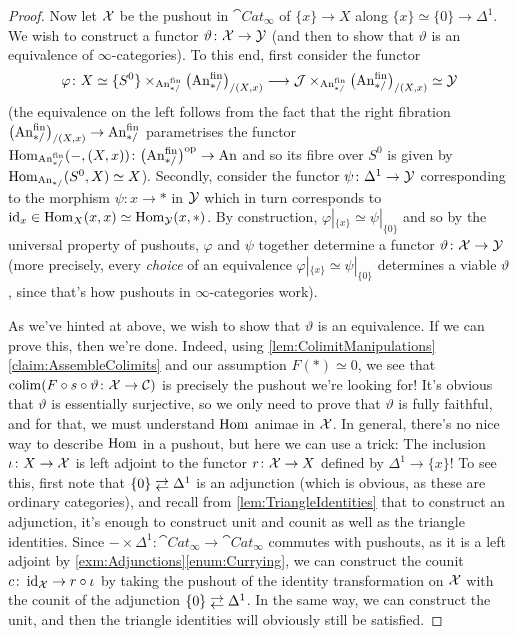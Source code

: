 \begin{proof}
	Now let $\mathcal{X}$ be the pushout in $\cat{Cat}_\infty$ of $\{x\}\rightarrow X$ along $\{x\}\simeq \{0\}\rightarrow \Delta^1$. We wish to construct a functor $\vartheta\colon \mathcal{X}\rightarrow \mathcal{Y}$ (and then to show that $\vartheta$ is an equivalence of $\infty$-categories). To this end, first consider the functor
	\begin{equation*}
		\varphi\colon X\simeq \{S^0\}\times_{\FinAn}\bigl(\FinAn\bigr)_{/(X,x)}\longrightarrow \Jj\times_{\FinAn}\bigl(\FinAn\bigr)_{/(X,x)}\simeq \Yy
	\end{equation*}
	(the equivalence on the left follows from the fact that the right fibration $\bigl(\FinAn\bigr)\vphantom{)}^\mathrm{\phantom{fin}}_{/(X,x)}\rightarrow \FinAn$ parametrises the functor $\Hom_{\FinAn}(-,(X,x))\colon \bigl(\FinAn\bigr)^{\smash{\op}}\rightarrow \cat{An}$ and so its fibre over $S^0$ is given by $\operatorname{Hom}_{\mathrm{An}_{*/}}(S^0,X)\simeq X$). Secondly, consider the functor $\psi\colon \Delta^1\rightarrow \mathcal{Y}$ corresponding to the morphism $\psi\colon x\rightarrow *$ in $\mathcal{Y}$ which in turn corresponds to $\operatorname{id}_x\in \operatorname{Hom}_X(x,x)\simeq \operatorname{Hom}_{\mathcal{Y}}(x,*)$. By construction, $\varphi|_{\{x\}}\simeq \psi|_{\{0\}}$ and so by the universal property of pushouts, $\varphi$ and $\psi$ together determine a functor $\vartheta\colon \mathcal{X}\rightarrow \mathcal{Y}$ (more precisely, every \emph{choice} of an equivalence $\varphi|_{\{x\}}\simeq \psi|_{\{0\}}$ determines a viable $\vartheta$, since that's how pushouts in $\infty$-categories work).
	
	As we've hinted at above, we wish to show that $\vartheta$ is an equivalence. If we can prove this, then we're done. Indeed, using \cref{lem:ColimitManipulations}\cref{claim:AssembleColimits} and our assumption $F(*)\simeq 0$, we see that $\operatorname*{colim}(F\circ s\circ \vartheta\colon \mathcal{X}\rightarrow \mathcal{C})$ is precisely the pushout we're looking for! It's obvious that $\vartheta$ is essentially surjective, so we only need to prove that $\vartheta$ is fully faithful, and for that, we must understand $\operatorname{Hom}$ animae in $\mathcal{X}$. In general, there's no nice way to describe $\operatorname{Hom}$ in a pushout, but here we can use a trick: The inclusion $\iota\colon X\rightarrow \mathcal{X}$ is left adjoint to the functor $r\colon \mathcal{X}\rightarrow X$ defined by $\Delta^1\rightarrow \{x\}$! To see this, first note that $\{0\}\shortdoublelrmorphism \Delta^1$ is an adjunction (which is obvious, as these are ordinary categories), and recall from \cref{lem:TriangleIdentities} that to construct an adjunction, it's enough to construct unit and counit as well as the triangle identities. Since $-\times\Delta^1\colon \cat{Cat}_\infty\rightarrow\cat{Cat}_\infty$ commutes with pushouts, as it is a left adjoint by \cref{exm:Adjunctions}\cref{enum:Currying}, we can construct the counit $c\colon \operatorname{id}_{\mathcal{X}}\rightarrow r\circ \iota$ by taking the pushout of the identity transformation on $\mathcal{X}$ with the counit of the adjunction $\{0\}\shortdoublelrmorphism \Delta^1$. In the same way, we can construct the unit, and then the triangle identities will obviously still be satisfied.
	

\end{proof}
